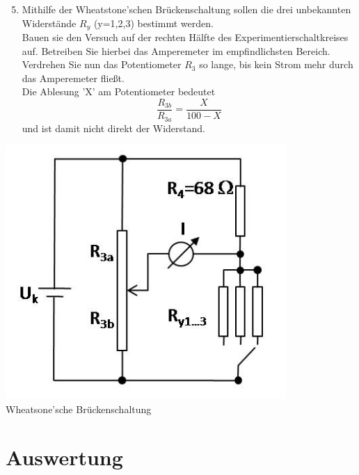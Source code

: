 \begin{minipage}[b]{0.6\textwidth}
\begin{enumerate} \setcounter{enumi}{4}
 \item Mithilfe der Wheatstone'schen Brückenschaltung sollen die drei unbekannten Widerstände $R_y$ (y=1,2,3) bestimmt werden. \\
  Bauen sie den Versuch auf der rechten Hälfte des Experimentierschaltkreises auf. Betreiben Sie hierbei das Amperemeter im empfindlichsten Bereich.\\
  Verdrehen Sie nun das Potentiometer $R_3$ so lange, bis kein Strom mehr durch das Amperemeter fließt.\\
  Die Ablesung 'X' am Potentiometer bedeutet
  \begin{equation}
   \frac{R_{3b}}{R_{3a}} = \frac{X}{100 - X}
  \end{equation}
  und ist damit nicht direkt der Widerstand.
\end{enumerate}
\end{minipage}
%
\begin{minipage}[b]{0.35\textwidth}
 \centering
 \includegraphics[width=0.8\textwidth]{Versuch_13-14/Abbildungen/Wheatstone.jpg}
 \label{fig:Wheatstone}\\
 Wheatsone'sche Brückenschaltung
\end{minipage}


\section{Auswertung} 

